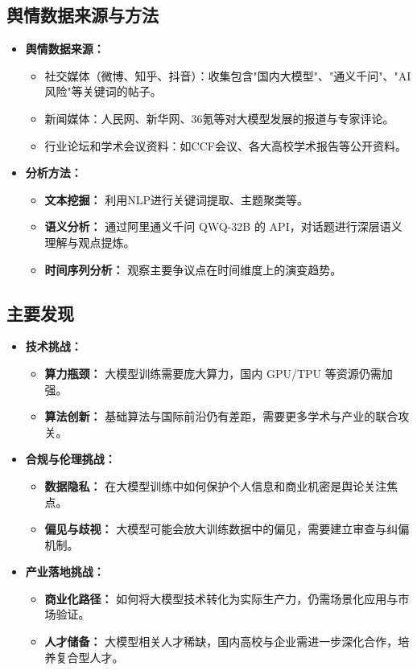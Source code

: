 \documentclass[12pt,a4paper]{ctexart}
\begin{document}
\subsection{舆情数据来源与方法}
\begin{itemize}
    \item \textbf{舆情数据来源：}
    \begin{itemize}
        \item 社交媒体（微博、知乎、抖音）：收集包含"国内大模型"、"通义千问"、"AI 风险"等关键词的帖子。
        \item 新闻媒体：人民网、新华网、36氪等对大模型发展的报道与专家评论。
        \item 行业论坛和学术会议资料：如CCF会议、各大高校学术报告等公开资料。
    \end{itemize}
    \item \textbf{分析方法：}
    \begin{itemize}
        \item \textbf{文本挖掘：} 利用NLP进行关键词提取、主题聚类等。
        \item \textbf{语义分析：} 通过阿里通义千问 QWQ-32B 的 API，对话题进行深层语义理解与观点提炼。
        \item \textbf{时间序列分析：} 观察主要争议点在时间维度上的演变趋势。
    \end{itemize}
\end{itemize}

\subsection{主要发现}
\begin{itemize}
    \item \textbf{技术挑战：}
    \begin{itemize}
        \item \textbf{算力瓶颈：} 大模型训练需要庞大算力，国内 GPU/TPU 等资源仍需加强。
        \item \textbf{算法创新：} 基础算法与国际前沿仍有差距，需要更多学术与产业的联合攻关。
    \end{itemize}
    \item \textbf{合规与伦理挑战：}
    \begin{itemize}
        \item \textbf{数据隐私：} 在大模型训练中如何保护个人信息和商业机密是舆论关注焦点。
        \item \textbf{偏见与歧视：} 大模型可能会放大训练数据中的偏见，需要建立审查与纠偏机制。
    \end{itemize}
    \item \textbf{产业落地挑战：}
    \begin{itemize}
        \item \textbf{商业化路径：} 如何将大模型技术转化为实际生产力，仍需场景化应用与市场验证。
        \item \textbf{人才储备：} 大模型相关人才稀缺，国内高校与企业需进一步深化合作，培养复合型人才。
    \end{itemize}
\end{itemize}
\end{document}
